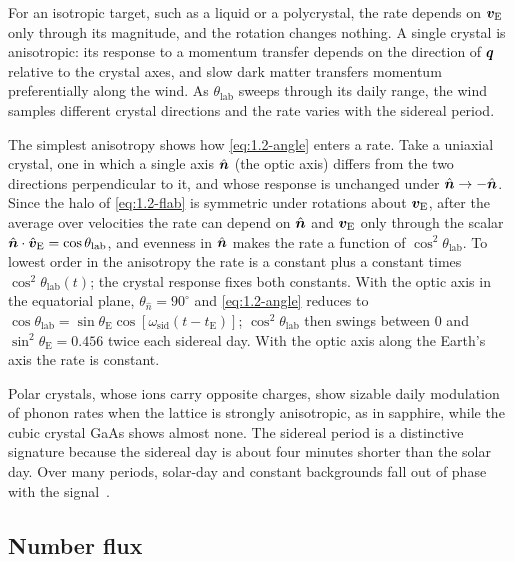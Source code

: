 For an isotropic target, such as a liquid or a polycrystal, the rate depends on $\bm{v}_{\mathrm{E}}$ only through its magnitude, and the rotation changes nothing. A single crystal is anisotropic: its response to a momentum transfer depends on the direction of $\bm{q}$ relative to the crystal axes, and slow dark matter transfers momentum preferentially along the wind. As $\theta_{\mathrm{lab}}$ sweeps through its daily range, the wind samples different crystal directions and the rate varies with the sidereal period.

The simplest anisotropy shows how \cref{eq:1.2-angle} enters a rate. Take a uniaxial crystal, one in which a single axis $\hat{\bm{n}}$ (the optic axis) differs from the two directions perpendicular to it, and whose response is unchanged under $\hat{\bm{n}} \to -\hat{\bm{n}}$. Since the halo of \cref{eq:1.2-flab} is symmetric under rotations about $\bm{v}_{\mathrm{E}}$, after the average over velocities the rate can depend on $\hat{\bm{n}}$ and $\bm{v}_{\mathrm{E}}$ only through the scalar $\hat{\bm{n}}\cdot\hat{\bm{v}}_{\mathrm{E}} = \cos\theta_{\mathrm{lab}}$, and evenness in $\hat{\bm{n}}$ makes the rate a function of $\cos^2\theta_{\mathrm{lab}}$. To lowest order in the anisotropy the rate is a constant plus a constant times $\cos^2\theta_{\mathrm{lab}}(t)$; the crystal response fixes both constants. With the optic axis in the equatorial plane, $\theta_{\hat{n}} = 90^\circ$ and \cref{eq:1.2-angle} reduces to $\cos\theta_{\mathrm{lab}} = \sin\theta_{\mathrm{E}}\cos[\omega_{\mathrm{sid}}(t - t_{\mathrm{E}})]$; $\cos^2\theta_{\mathrm{lab}}$ then swings between 0 and $\sin^2\theta_{\mathrm{E}} = 0.456$ twice each sidereal day. With the optic axis along the Earth's axis the rate is constant.

Polar crystals, whose ions carry opposite charges, show sizable daily modulation of phonon rates when the lattice is strongly anisotropic, as in sapphire, while the cubic crystal GaAs shows almost none. The sidereal period is a distinctive signature because the sidereal day is about four minutes shorter than the solar day. Over many periods, solar-day and constant backgrounds fall out of phase with the signal~\cite[Sect.~III\,C]{griffin2018directional}.

\subsection{Number flux}

